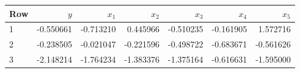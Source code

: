 \begin{center}
\small
\setlength{\tabcolsep}{4pt}
\begin{tabular}{lrrrrrr}
\toprule
Row & $y$ & $x_1$ & $x_2$ & $x_3$ & $x_4$ & $x_5$ \\
\midrule
1 & -0.550661 & -0.713210 & 0.445966 & -0.510235 & -0.161905 & 1.572716 \\
2 & -0.238505 & -0.021047 & -0.221596 & -0.498722 & -0.683671 & -0.561626 \\
3 & -2.148214 & -1.764234 & -1.383376 & -1.375164 & -0.616631 & -1.595000 \\
\bottomrule
\end{tabular}
\end{center}
